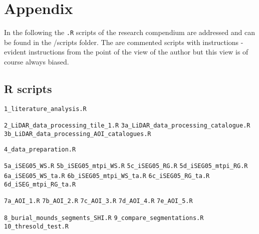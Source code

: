 \documentclass[
  12pt,
]{article}
\begin{document}
\newpage

\hypertarget{appendix}{%
\section{Appendix}\label{appendix}}

In the following the \texttt{.R} scripts of the research compendium are addressed and can be found in the /scripts folder. The are commented scripts with instructions - evident instructions from the point of the view of the author but this view is of course always biased.

\hypertarget{r-scripts}{%
\subsection{R scripts}\label{r-scripts}}

\texttt{1\_literature\_analysis.R}

\texttt{2\_LiDAR\_data\_processing\_tile\_1.R}
\newline
\texttt{3a\_LiDAR\_data\_processing\_catalogue.R}
\newline
\texttt{3b\_LiDAR\_data\_processing\_AOI\_catalogues.R}
\newline

\texttt{4\_data\_preparation.R}
\newline

\texttt{5a\_iSEG05\_WS.R}
\newline
\texttt{5b\_iSEG05\_mtpi\_WS.R}
\newline
\texttt{5c\_iSEG05\_RG.R}
\newline
\texttt{5d\_iSEG05\_mtpi\_RG.R}
\newline
\texttt{6a\_iSEG05\_WS\_ta.R}
\newline
\texttt{6b\_iSEG05\_mtpi\_WS\_ta.R}
\newline
\texttt{6c\_iSEG05\_RG\_ta.R}
\newline
\texttt{6d\_iSEG\_mtpi\_RG\_ta.R}

\texttt{7a\_AOI\_1.R}
\newline
\texttt{7b\_AOI\_2.R}
\newline
\texttt{7c\_AOI\_3.R}
\newline
\texttt{7d\_AOI\_4.R}
\newline
\texttt{7e\_AOI\_5.R}
\newline

\texttt{8\_burial\_mounds\_segments\_SHI.R}
\newline
\texttt{9\_compare\_segmentations.R}
\newline
\texttt{10\_thresold\_test.R}
\newline
\end{document}
